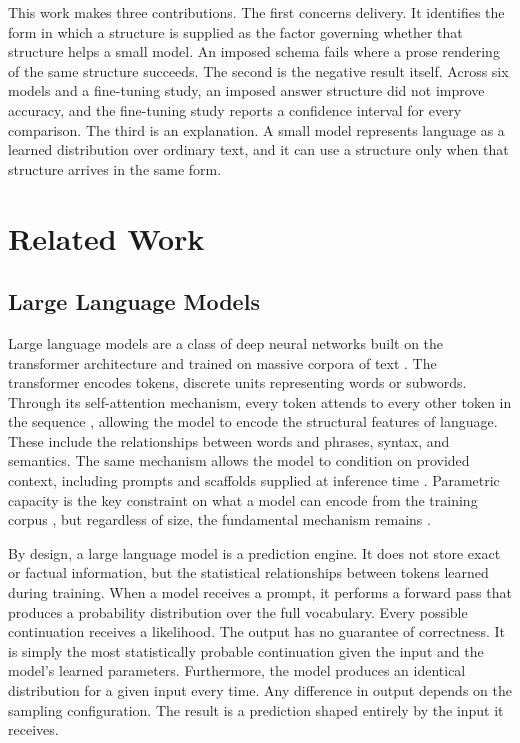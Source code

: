 \documentclass[master]{thesis}
\begin{document}
This work makes three contributions. The first concerns delivery. It identifies the form in which a structure is supplied as the factor governing whether that structure helps a small model. An imposed schema fails where a prose rendering of the same structure succeeds. The second is the negative result itself. Across six models and a fine-tuning study, an imposed answer structure did not improve accuracy, and the fine-tuning study reports a confidence interval for every comparison. The third is an explanation. A small model represents language as a learned distribution over ordinary text, and it can use a structure only when that structure arrives in the same form.

\chapter{Related Work}
\label{ch:lit}

\section{Large Language Models}
\label{sec:llm}

Large language models are a class of deep neural networks built on the transformer architecture and trained on massive corpora of text \cite{vaswani2017attention, llmoverview2023}. The transformer encodes tokens, discrete units representing words or subwords. Through its self-attention mechanism, every token attends to every other token in the sequence \cite{vaswani2017attention}, allowing the model to encode the structural features of language. These include the relationships between words and phrases, syntax, and semantics. The same mechanism allows the model to condition on provided context, including prompts and scaffolds supplied at inference time \cite{brown2020gpt3}. Parametric capacity is the key constraint on what a model can encode from the training corpus \cite{kaplan2020scaling}, but regardless of size, the fundamental mechanism remains \cite{costofdownscaling2023}.

By design, a large language model is a prediction engine. It does not store exact or factual information, but the statistical relationships between tokens learned during training. When a model receives a prompt, it performs a forward pass that produces a probability distribution over the full vocabulary. Every possible continuation receives a likelihood. The output has no guarantee of correctness. It is simply the most statistically probable continuation given the input and the model's learned parameters. Furthermore, the model produces an identical distribution for a given input every time. Any difference in output depends on the sampling configuration. The result is a prediction shaped entirely by the input it receives.
\end{document}
